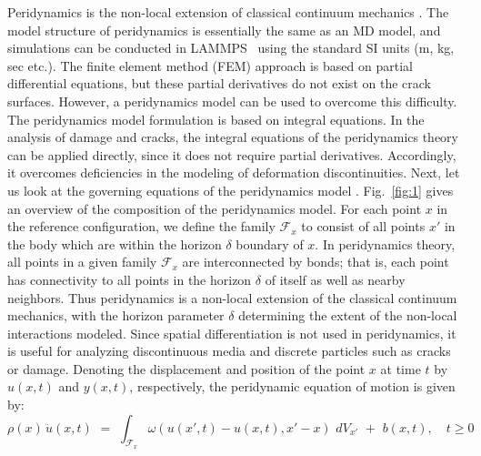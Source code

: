 Peridynamics is the non-local extension of classical continuum mechanics \cite{Ref15}. The model structure of peridynamics is essentially the same as an MD model, and simulations can be conducted in LAMMPS~\cite{Ref16} using the
standard SI units (m, kg, sec etc.).
The finite element method (FEM) approach is based on partial differential equations, but these partial derivatives do not exist on the crack surfaces.
However, a peridynamics model can be used to overcome this difficulty.
The peridynamics model formulation is based on integral equations.
In the analysis of damage and cracks, the integral equations of the peridynamics theory can be applied directly, since it does not require partial derivatives.
Accordingly, it overcomes deficiencies in the modeling of deformation discontinuities.
Next, let us look at the governing equations of the peridynamics model \cite{Ref2,Ref3,Ref4}.
Fig.~\ref{fig:1} gives an overview of the composition of the peridynamics model.
For each point $x$ in the reference configuration, we define the family $\mathcal{F}_x$ to consist of all points $x'$ in the body which are within the horizon $\delta$ boundary of $x$.
In peridynamics theory, all points in a given family $\mathcal{F}_x$ are interconnected by bonds; that is, each point has connectivity to all points in the horizon $\delta$ of itself as well as nearby neighbors.
Thus peridynamics is a non-local extension of the classical continuum mechanics, with the horizon parameter $\delta$ determining the extent of the non-local interactions modeled. 
Since spatial differentiation is not used in peridynamics, it is useful for analyzing discontinuous media and discrete particles such as cracks or damage.
Denoting the displacement and position of the point $x$ at time $t$ by $u(x,t)$ and $y(x,t)$, respectively,
the peridynamic equation of motion is given by:
\begin{equation}
\rho(x) \, \ddot{u}(x,t) \, \, = \, \, \int_{\mathcal{F}_x} \omega\left(u(x',t)-u(x,t),x'-x\right) \, \, dV_{x'} \, \, + \, \, b(x,t), \quad t\geq0
\end{equation}

